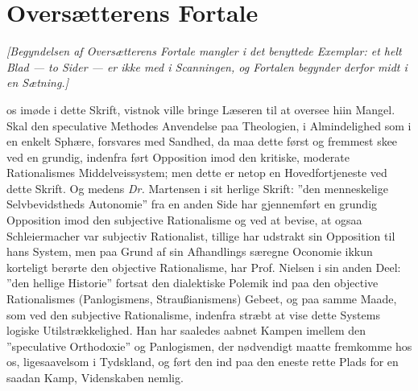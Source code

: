 \documentclass[12pt]{book}
\begin{document}
%
\chapter*{Oversætterens Fortale}
{}

\textit{[Begyndelsen af Oversætterens Fortale mangler i det benyttede
Exemplar: et helt Blad --- to Sider --- er ikke med i Scanningen, og Fortalen
begynder derfor midt i en Sætning.]}

\noindent os imøde i dette Skrift, vistnok ville bringe Læseren til at oversee
hiin Mangel. Skal den speculative Methodes Anvendelse paa Theologien, i
Almindelighed som i en enkelt Sphære, forsvares med Sandhed, da maa dette
først og fremmest skee ved en grundig, indenfra ført Opposition imod den
kritiske, moderate Rationalismes Middelveissystem; men dette er netop en
Hovedfortjeneste ved dette Skrift. Og medens \textit{Dr.} Martensen
i sit herlige Skrift: ”den menneskelige Selvbevidstheds Autonomie” fra en
anden Side har gjennemført en grundig Opposition imod den subjective
Rationalisme og ved at bevise, at ogsaa Schleiermacher var subjectiv
Rationalist, tillige har udstrakt sin Opposition til hans System, men paa
Grund af sin Afhandlings særegne Oconomie ikkun korteligt berørte den
objective Rationalisme, har Prof. Nielsen i sin anden Deel: ”den hellige
Historie” fortsat den dialektiske Polemik ind paa den objective
Rationalismes (Panlogismens, Straußianismens) Gebeet, og paa samme Maade,
som ved den subjective Rationalisme, indenfra stræbt at vise dette Systems
logiske Utilstrækkelighed. Han har saaledes aabnet Kampen imellem den
”speculative Orthodoxie” og Panlogismen, der nødvendigt maatte fremkomme hos
os, ligesaavelsom i Tydskland, og ført den ind paa den eneste rette Plads for
en saadan Kamp, Videnskaben nemlig.
\end{document}
